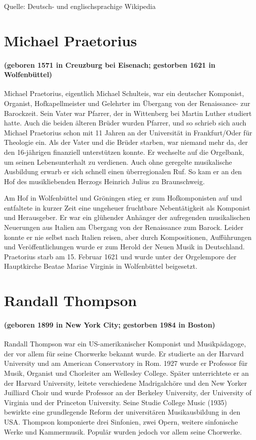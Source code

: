 \documentclass[11pt, ngermanm, titlepage]{article}
\begin{document}
\begin{multicols}{2}
	Quelle: Deutsch- und englischsprachige Wikipedia
	
	\section*{Michael Praetorius}
	\paragraph{(geboren 1571 in Creuzburg bei Eisenach; gestorben 1621 in Wolfenbüttel)\newline}
	Michael Praetorius, eigentlich Michael Schulteis, war ein deutscher Komponist, Organist, Hofkapellmeister und Gelehrter im Übergang von der Renaissance- zur Barockzeit. Sein Vater war Pfarrer, der in Wittenberg bei Martin Luther studiert hatte. Auch die beiden älteren Brüder wurden Pfarrer, und so schrieb sich auch Michael Praetorius schon mit 11 Jahren an der Universität in Frankfurt/Oder für Theologie ein. Als der Vater und die Brüder starben, war niemand mehr da, der den 16-jährigen finanziell unterstützen konnte. Er wechselte auf die Orgelbank, um seinen Lebensunterhalt zu verdienen. Auch ohne geregelte musikalische Ausbildung erwarb er sich schnell einen überregionalen Ruf. So kam er an den Hof des musikliebenden Herzogs Heinrich Julius zu Braunschweig. 
	
	Am Hof in Wolfenbüttel und Gröningen stieg er zum Hofkomponisten auf und entfaltete in kurzer Zeit eine ungeheuer fruchtbare Nebentätigkeit als Komponist und Herausgeber. Er war ein glühender Anhänger der aufregenden musikalischen Neuerungen aus Italien am Übergang von der Renaissance zum Barock. Leider konnte er nie selbst nach Italien reisen, aber durch Kompositionen, Aufführungen und Veröffentlichungen wurde er zum Herold der Neuen Musik in Deutschland. Praetorius starb am 15. Februar 1621 und wurde unter der Orgelempore der Hauptkirche Beatae Mariae Virginis in Wolfenbüttel beigesetzt.
	
	\section*{Randall Thompson}
	\paragraph{(geboren 1899 in New York City; gestorben 1984 in Boston) \newline}
	Randall Thompson war ein US-amerikanischer Komponist und Musikpädagoge, der vor allem für seine Chorwerke bekannt wurde. Er studierte an der Harvard University und am American Conservatory in Rom. 1927 wurde er Professor für Musik, Organist und Chorleiter am Wellesley College. Später unterrichtete er an der Harvard University, leitete verschiedene Madrigalchöre und den New Yorker Juilliard Choir und wurde Professor an der Berkeley University, der University of Virginia und der Princeton University. Seine Studie College Music (1935) bewirkte eine grundlegende Reform der universitären Musikausbildung in den USA. Thompson komponierte drei Sinfonien, zwei Opern, weitere sinfonische Werke und Kammermusik. Populär wurden jedoch vor allem seine Chorwerke.
	

\end{multicols}
\end{document}
